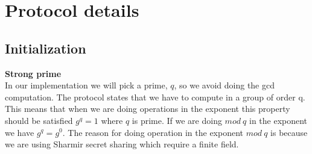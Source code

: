 \section{Protocol details}

\subsection{Initialization}
\noindent
\textbf{Strong prime}\\
In our implementation we will pick a prime, \begin{math}q\end{math}, so we avoid doing the gcd computation. The protocol states that we have to compute in a group of order q. This means that when we are doing operations in the exponent this property should be satisfied \begin{math}g^q=1\end{math} where \begin{math}q\end{math} is prime. If we are doing \begin{math}mod \ q \end{math} in the exponent we have \begin{math}g^q=g^0\end{math}. The reason for doing operation in the exponent \begin{math}mod \ q\end{math} is because we are using Sharmir secret sharing which require a finite field.\\


